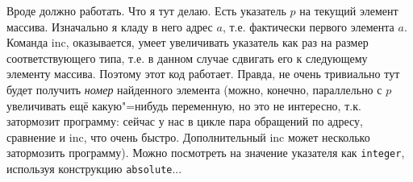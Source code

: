 Вроде должно работать. Что я тут делаю. Есть указатель $p$ на текущий элемент массива. Изначально я 
кладу в него адрес $a$, т.е. фактически первого элемента $a$. Команда inc, оказывается, умеет 
увеличивать указатель как раз на размер соответствующего типа, т.е. в данном случае сдвигать его к 
следующему элементу массива. Поэтому этот код работает. Правда, не очень тривиально тут будет 
получить \textit{номер} найденного элемента (можно, конечно, параллельно с $p$ увеличивать ещё 
какую"=нибудь переменную, но это не интересно, т.к. затормозит программу: сейчас у нас в цикле пара 
обращений по адресу, сравнение и inc, что очень быстро. Дополнительный inc может несколько
затормозить программу). Можно посмотреть на значение указателя как \verb|integer|, используя 
конструкцию \verb|absolute|...
